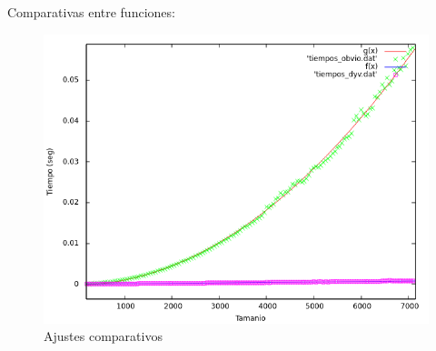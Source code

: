 \documentclass{article}
\begin{document}
	Comparativas entre funciones:
	
	\begin{figure}[H]
		\centering
		\includegraphics[totalheight=8cm]{img/ajustes_total}
		\caption{Ajustes comparativos}
		\label{fig:ajustes_total}
	\end{figure}
\end{document}
